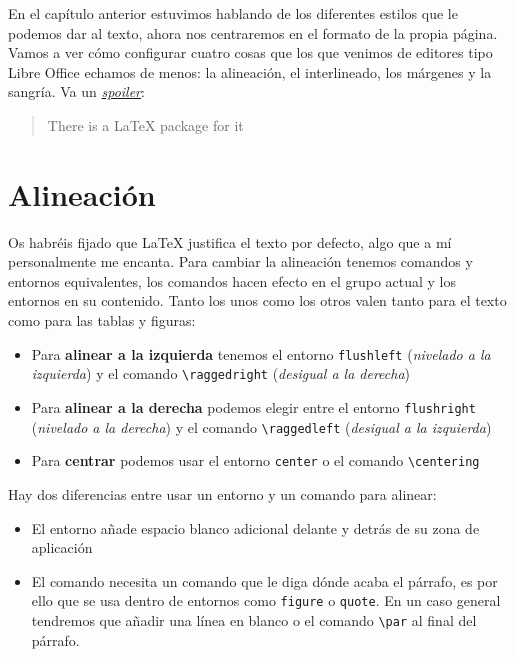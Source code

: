 En el capítulo anterior estuvimos hablando de los diferentes estilos que
le podemos dar al texto, ahora nos centraremos en el formato de la
propia página. Vamos a ver cómo configurar cuatro cosas que los que
venimos de editores tipo Libre Office echamos de menos: la alineación,
el interlineado, los márgenes y la sangría. Va un
\href{https://www.xkcd.com/378/}{\emph{spoiler}}:

\begin{quote}
There is a LaTeX package for it
\end{quote}

\section{Alineación}\label{sec:alineacion}

Os habréis fijado que LaTeX justifica el texto por defecto, algo que a
mí personalmente me encanta. Para cambiar la alineación tenemos comandos
y entornos equivalentes, los comandos hacen efecto en el grupo actual y
los entornos en su contenido. Tanto los unos como los otros valen tanto
para el texto como para las tablas y figuras:

\begin{itemize}
\itemsep1pt\parskip0pt
\item
  Para \textbf{alinear a la izquierda} tenemos el entorno
  \lstinline!flushleft! (\emph{nivelado a la izquierda}) y el comando
  \lstinline!\raggedright! (\emph{desigual a la derecha})
\item
  Para \textbf{alinear a la derecha} podemos elegir entre el entorno
  \lstinline!flushright! (\emph{nivelado a la derecha}) y el comando
  \lstinline!\raggedleft! (\emph{desigual a la izquierda})
\item
  Para \textbf{centrar} podemos usar el entorno \lstinline!center! o el
  comando \lstinline!\centering!
\end{itemize}

Hay dos diferencias entre usar un entorno y un comando para alinear:

\begin{itemize}
\item
  El entorno añade espacio blanco adicional delante y detrás de su zona
  de aplicación
\item
  El comando necesita un comando que le diga dónde acaba el párrafo, es
  por ello que se usa dentro de entornos como \lstinline!figure! o
  \lstinline!quote!. En un caso general tendremos que añadir una línea
  en blanco o el comando \lstinline!\par! al final del párrafo.
\end{itemize}

